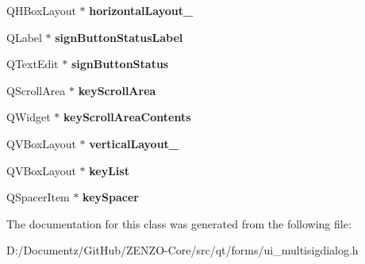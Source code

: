 \begin{DoxyCompactItemize}
Q\+H\+Box\+Layout $\ast$ {\bfseries horizontal\+Layout\+\_}
\item 
\mbox{\label{class_ui___multisig_dialog_a6164a8a526be02ed1cfca48cb71c8d8b}} 
Q\+Label $\ast$ {\bfseries sign\+Button\+Status\+Label}
\item 
\mbox{\label{class_ui___multisig_dialog_aaa355a3a051a56128c83b66fedfa1ee7}} 
Q\+Text\+Edit $\ast$ {\bfseries sign\+Button\+Status}
\item 
\mbox{\label{class_ui___multisig_dialog_a18dcc669edabfa763a070e88907fb21a}} 
Q\+Scroll\+Area $\ast$ {\bfseries key\+Scroll\+Area}
\item 
\mbox{\label{class_ui___multisig_dialog_ae64931f81ea8cd37e1ca108f0326a70b}} 
Q\+Widget $\ast$ {\bfseries key\+Scroll\+Area\+Contents}
\item 
\mbox{\label{class_ui___multisig_dialog_a6d6dbb9a9d70d8046506270ed89734d8}} 
Q\+V\+Box\+Layout $\ast$ {\bfseries vertical\+Layout\+\_}
\item 
\mbox{\label{class_ui___multisig_dialog_a98f2289adb32c6b909a8af84c7b65102}} 
Q\+V\+Box\+Layout $\ast$ {\bfseries key\+List}
\item 
\mbox{\label{class_ui___multisig_dialog_accd47858a81d38d5aeb7ab1a8059bceb}} 
Q\+Spacer\+Item $\ast$ {\bfseries key\+Spacer}
\end{DoxyCompactItemize}


The documentation for this class was generated from the following file\+:\begin{DoxyCompactItemize}
\item 
D\+:/\+Documentz/\+Git\+Hub/\+Z\+E\+N\+Z\+O-\/\+Core/src/qt/forms/ui\+\_\+multisigdialog.\+h\end{DoxyCompactItemize}
